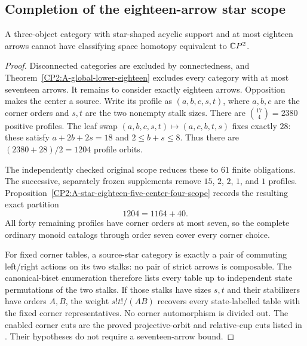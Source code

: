 \subsection{Completion of the eighteen-arrow star scope}

\begin{theorem}
\label{CP2:A-star-eighteen-complete}
A three-object category with star-shaped acyclic support
and at most eighteen arrows cannot have classifying space
homotopy equivalent to $\mathbb{C}P^2$.
\end{theorem}
\begin{proof}
Disconnected categories are excluded by connectedness, and
Theorem~\ref{CP2:A-global-lower-eighteen} excludes every
category with at most seventeen arrows.  It remains to
consider exactly eighteen arrows.  Opposition makes the
center a source.  Write its profile as $(a,b,c,s,t)$,
where $a,b,c$ are the corner orders and $s,t$ are the
two nonempty stalk sizes.  There are
$\binom{17}{4}=2380$ positive profiles.  The leaf swap
$(a,b,c,s,t)\mapsto(a,c,b,t,s)$ fixes exactly $28$:
these satisfy $a+2b+2s=18$ and $2\le b+s\le8$.
Thus there are $(2380+28)/2=1204$ profile orbits.

The independently checked original scope reduces these
to $61$ finite obligations.  The successive, separately
frozen supplements remove $15$, $2$, $2$, $1$, and $1$
profiles.  Proposition~\ref{CP2:A-star-eighteen-five-center-four-scope}
records the resulting exact partition
\[
  1204=1164+40.
\]
All forty remaining profiles have corner orders at most
seven, so the complete ordinary monoid catalogs through
order seven cover every corner choice.

For fixed corner tables, a source-star category is
exactly a pair of commuting left/right actions on its
two stalks: no pair of strict arrows is composable.
The canonical-biset enumeration therefore lists every
table up to independent state permutations of the two
stalks.  If those stalks have sizes $s,t$ and their
stabilizers have orders $A,B$, the weight
$s!t!/(AB)$ recovers every state-labelled table with
the fixed corner representatives.  No corner
automorphism is divided out.  The enabled corner cuts
are the proved projective-orbit and relative-cup cuts
listed in .
Their hypotheses do not require a seventeen-arrow bound.


\end{proof}
